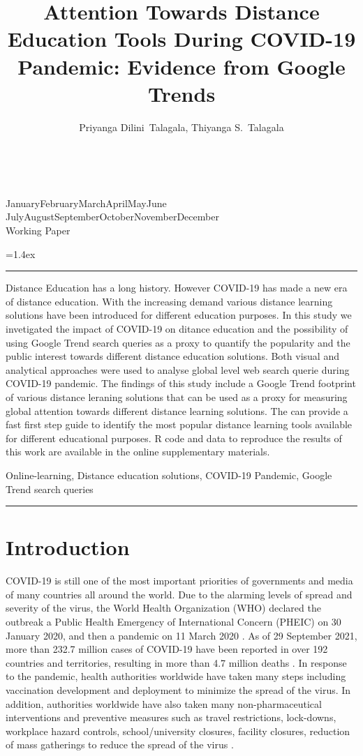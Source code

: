 \documentclass[11pt,a4paper,]{article}
\title{Attention Towards Distance Education Tools During COVID-19 Pandemic: Evidence from Google Trends}
\author{Priyanga Dilini~Talagala, Thiyanga S.~Talagala}
\date{\sf\Date~\Month~\Year}
\makeatletter
\def\Date{\number\day}
\def\Month{\ifcase\month\or
 January\or February\or March\or April\or May\or June\or
 July\or August\or September\or October\or November\or December\fi}
\def\Year{\number\year}
\def\showjel{{\large\textsf{\textbf{JEL classification:}}~\@jel}}
\def\cover{{\sffamily\setcounter{page}{0}
        \thispagestyle{empty}
        \vspace*{2cm}
        \begin{center}
        \fbox{\parbox{14cm}{\begin{onehalfspace}\centering\Huge\vspace*{0.3cm}
                \textsf{\textbf{\expandafter{\@title}}}\vspace{1cm}\par
                \LARGE\@author\end{onehalfspace}
        }}
        \end{center}
        \vfill
                \begin{center}\Large
                \Month~\Year\\[1cm]
                Working Paper \@wp
        \end{center}\vspace*{2cm}}}
\def\pageone{{\sffamily\setstretch{1}%
        \thispagestyle{empty}%
        \vbox to \textheight{%
        \raggedright\baselineskip=1.2cm
     {\fontsize{24.88}{30}\sffamily\textbf{\expandafter{\@title}}}
        \vspace{2cm}\par
        \hspace{1cm}\parbox{14cm}{\sffamily\large\@addresses}\vspace{1cm}\vfill
        \hspace{1cm}{\large\Date~\Month~\Year}\\[1cm]
        \hspace{1cm}\showjel\vss}}}
\def\blindtitle{{\sffamily
     \thispagestyle{plain}\raggedright\baselineskip=1.2cm
     {\fontsize{24.88}{30}\sffamily\textbf{\expandafter{\@title}}}\vspace{1cm}\par
        }}
\def\titlepage{{\cover\newpage\pageone\newpage\blindtitle}}
\let\maketitle\titlepage
\newenvironment{keywords}{\par\vspace{0.5cm}\noindent{\sffamily\textbf{Keywords:}}}{\vspace{0.25cm}\par\hrule\vspace{0.5cm}\par}
\renewenvironment{abstract}{\begin{minipage}{\textwidth}\parskip=1.4ex\noindent
\hrule\vspace{0.1cm}\par{\sffamily\textbf{\abstractname}}\newline}
  {\end{minipage}}
\makeatother
\begin{document}
\maketitle
\begin{abstract}
Distance Education has a long history. However COVID-19 has made a new era of distance education. With the increasing demand various distance learning solutions have been introduced for different education purposes. In this study we invetigated the impact of COVID-19 on ditance education and the possibility of using Google Trend search queries as a proxy to quantify the popularity and the public interest towards different distance education solutions. Both visual and analytical approaches were used to analyse global level web search querie during COVID-19 pandemic. The findings of this study include a Google Trend footprint of various distance leraning solutions that can be used as a proxy for measuring global attention towards different distance learning solutions. The can provide a fast first step guide to identify the most popular distance learning tools available for different educational purposes. R code and data to reproduce the results of this work are available in the online supplementary materials.
\end{abstract}
\begin{keywords}
Online-learning, Distance education solutions, COVID-19 Pandemic, Google Trend search queries
\end{keywords}

\hypertarget{introduction}{%
\section{Introduction}\label{introduction}}

COVID-19 is still one of the most important priorities of governments and media of many countries all around the world. Due to the alarming levels of spread and severity of the virus, the World Health Organization (WHO) declared the outbreak a Public Health Emergency of International Concern (PHEIC) on 30 January 2020, and then a pandemic on 11 March 2020 \autocite{world2020timeline}. As of 29 September 2021, more than 232.7 million cases of COVID-19 have been reported in over 192 countries and territories, resulting in more than 4.7 million deaths \autocite{dong2020interactive}. In response to the pandemic, health authorities worldwide have taken many steps including vaccination development and deployment to minimize the spread of the virus. In addition, authorities worldwide have also taken many non-pharmaceutical interventions and preventive measures such as travel restrictions, lock-downs, workplace hazard controls, school/university closures, facility closures, reduction of mass gatherings to reduce the spread of the virus \autocite{chang2020modelling}.
\end{document}
